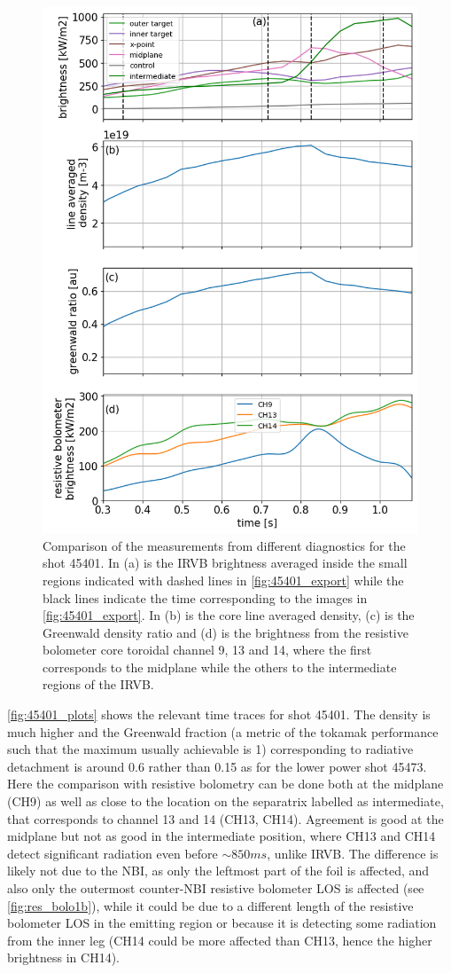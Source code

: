 \begin{figure}
	\centering
	\includegraphics[width=0.7\linewidth,trim={15 0 0 0},clip]{Chapters/chapter2/figs/45401_for_paper.png}
	\caption{Comparison of the measurements from different diagnostics for the shot 45401. In (a) is the IRVB brightness averaged inside the small regions indicated with dashed lines in \autoref{fig:45401_export} while the black lines indicate the time corresponding to the images in \autoref{fig:45401_export}. In (b) is the core line averaged density, (c) is the Greenwald density ratio and (d) is the brightness from the resistive bolometer core toroidal channel 9, 13 and 14, where the first corresponds to the midplane while the others to the intermediate regions of the IRVB.}
	\label{fig:45401_plots}
\end{figure}

\autoref{fig:45401_plots} shows the relevant time traces for shot 45401. The density is much higher and the Greenwald fraction (a metric of the tokamak performance such that the maximum usually achievable is 1\cite{Greenwald2002a}) corresponding to radiative detachment is around 0.6 rather than 0.15 as for the lower power shot 45473. Here the comparison with resistive bolometry can be done both at the midplane (CH9) as well as close to the location on the separatrix labelled as intermediate, that corresponds to channel 13 and 14 (CH13, CH14). Agreement is good at the midplane but not as good in the intermediate position, where CH13 and CH14 detect significant radiation even before $\sim850ms$, unlike IRVB. The difference is likely not due to the NBI, as only the leftmost part of the foil is affected, and also only the outermost counter-NBI resistive bolometer LOS is affected (see \autoref{fig:res_bolo1b}), while it could be due to a different length of the resistive bolometer LOS in the emitting region or because it is detecting some radiation from the inner leg (CH14 could be more affected than CH13, hence the higher brightness in CH14).





